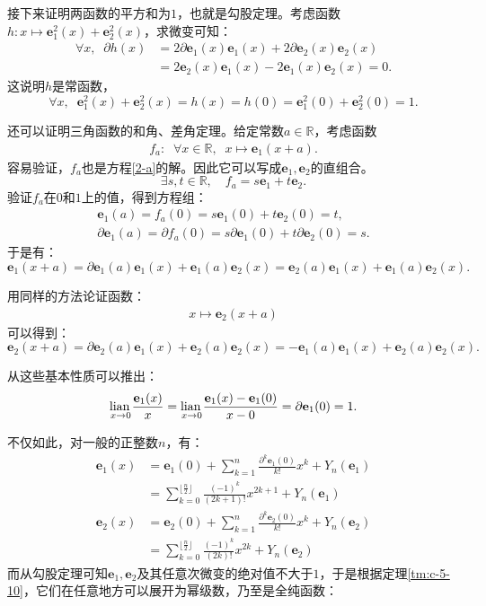 \documentclass[12pt,UTF8]{ctexbook}
\begin{document}
\begin{appendix}
接下来证明两函数的平方和为$1$，也就是勾股定理。考虑函数$h: x\mapsto \mathbf{e}_1^2(x) + \mathbf{e}_2^2(x)$，求微变可知：
\begin{align*}
    \forall x, \;\; \partial h(x) &= 2 \partial \mathbf{e}_1(x)\mathbf{e}_1(x) + 2\partial \mathbf{e}_2(x)\mathbf{e}_2(x) \\
    &= 2 \mathbf{e}_2(x)\mathbf{e}_1(x) - 2 \mathbf{e}_1(x)\mathbf{e}_2(x) = 0.
\end{align*}
这说明$h$是常函数，
$$\forall x, \;\; \mathbf{e}_1^2(x) + \mathbf{e}_2^2(x) = h(x) = h(0) = \mathbf{e}_1^2(0) + \mathbf{e}_2^2(0) = 1. $$

还可以证明三角函数的和角、差角定理。给定常数$a\in\mathbb{R}$，考虑函数
\begin{align*}
    f_a: \;\; \forall x\in \mathbb{R}, \;\; x\mapsto \mathbf{e}_1(x + a).
\end{align*}
容易验证，$f_a$也是方程\eqref{2-a}的解。因此它可以写成$\mathbf{e}_1, \mathbf{e}_2$的直组合。
$$ \exists s, t \in \mathbb{R}, \quad f_a = s\mathbf{e}_1 + t\mathbf{e}_2. $$
验证$f_a$在$0$和$1$上的值，得到方程组：
$$
\begin{array}{ll}
    \mathbf{e}_1(a) = f_a(0) = s\mathbf{e}_1(0) + t \mathbf{e}_2(0) = t,\\
    \partial \mathbf{e}_1(a) = \partial f_a(0) = s\partial \mathbf{e}_1(0) + t \partial \mathbf{e}_2(0) = s.
\end{array}
$$
于是有：
$$ \mathbf{e}_1(x + a) = \partial \mathbf{e}_1(a)\mathbf{e}_1(x) + \mathbf{e}_1(a)\mathbf{e}_2(x) =  \mathbf{e}_2(a)\mathbf{e}_1(x) + \mathbf{e}_1(a)\mathbf{e}_2(x). $$

用同样的方法论证函数：
\begin{align*}
    x\mapsto \mathbf{e}_2(x + a)
\end{align*}
可以得到：
$$ \mathbf{e}_2(x + a) = \partial \mathbf{e}_2(a)\mathbf{e}_1(x) + \mathbf{e}_2(a)\mathbf{e}_2(x) = -\mathbf{e}_1(a)\mathbf{e}_1(x) + \mathbf{e}_2(a)\mathbf{e}_2(x). $$

从这些基本性质可以推出：
\begin{align*}
    \underset{x\to 0}{\operatorname{lian}\,} \frac{\mathbf{e}_1(x)}{x} = \underset{x\to 0}{\operatorname{lian}\,} \frac{\mathbf{e}_1(x) - \mathbf{e}_1(0)}{x - 0} = \partial \mathbf{e}_1(0) = 1.
\end{align*}

不仅如此，对一般的正整数$n$，有：
\begin{align*}
    \mathbf{e}_1(x) &= \mathbf{e}_1(0) + \sum_{k=1}^n \frac{\partial^k \mathbf{e}_1 (0)}{k!}x^k + Y_n(\mathbf{e}_1) \\
    &= \sum_{k=0}^{\lfloor\frac{n}{2}\rfloor} \frac{(-1)^{k}}{(2k+1)!}x^{2k+1}  + Y_n(\mathbf{e}_1) \\
    \mathbf{e}_2(x) &= \mathbf{e}_2(0) + \sum_{k=1}^n \frac{\partial^k \mathbf{e}_2 (0)}{k!}x^k  + Y_n(\mathbf{e}_2) \\
    &= \sum_{k=0}^{\lfloor\frac{n}{2}\rfloor} \frac{(-1)^{k}}{(2k)!}x^{2k} + Y_n(\mathbf{e}_2) 
\end{align*}
而从勾股定理可知$\mathbf{e}_1, \mathbf{e}_2$及其任意次微变的绝对值不大于$1$，于是根据定理\ref{tm:c-5-10}，它们在任意地方可以展开为幂级数，乃至是全纯函数：


\end{appendix}
\end{document}

